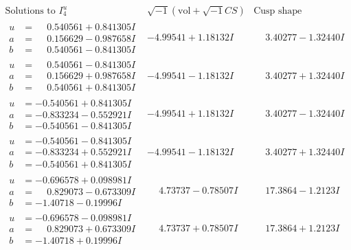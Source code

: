 \documentclass[1p]{elsarticle_modified}
\theoremstyle{definition}
\newcommand{\I}{\sqrt{-1}}
\begin{document}
$$\begin{array}{c|c|c}  
\text{Solutions to }I^u_{4}& \I (\text{vol} + \sqrt{-1}CS) & \text{Cusp shape}\\
 \hline 
\begin{aligned}
u &= \phantom{-}0.540561 + 0.841305 I \\
a &= \phantom{-}0.156629 - 0.987658 I \\
b &= \phantom{-}0.540561 - 0.841305 I\end{aligned}
 & -4.99541 + 1.18132 I & \phantom{-}3.40277 - 1.32440 I \\ \hline\begin{aligned}
u &= \phantom{-}0.540561 - 0.841305 I \\
a &= \phantom{-}0.156629 + 0.987658 I \\
b &= \phantom{-}0.540561 + 0.841305 I\end{aligned}
 & -4.99541 - 1.18132 I & \phantom{-}3.40277 + 1.32440 I \\ \hline\begin{aligned}
u &= -0.540561 + 0.841305 I \\
a &= -0.833234 - 0.552921 I \\
b &= -0.540561 - 0.841305 I\end{aligned}
 & -4.99541 + 1.18132 I & \phantom{-}3.40277 - 1.32440 I \\ \hline\begin{aligned}
u &= -0.540561 - 0.841305 I \\
a &= -0.833234 + 0.552921 I \\
b &= -0.540561 + 0.841305 I\end{aligned}
 & -4.99541 - 1.18132 I & \phantom{-}3.40277 + 1.32440 I \\ \hline\begin{aligned}
u &= -0.696578 + 0.098981 I \\
a &= \phantom{-}0.829073 - 0.673309 I \\
b &= -1.40718 - 0.19996 I\end{aligned}
 & \phantom{-}4.73737 - 0.78507 I & \phantom{-}17.3864 - 1.2123 I \\ \hline\begin{aligned}
u &= -0.696578 - 0.098981 I \\
a &= \phantom{-}0.829073 + 0.673309 I \\
b &= -1.40718 + 0.19996 I\end{aligned}
 & \phantom{-}4.73737 + 0.78507 I & \phantom{-}17.3864 + 1.2123 I \\ \hline\begin{aligned}

\end{aligned}
\end{array}$$
\end{document}
